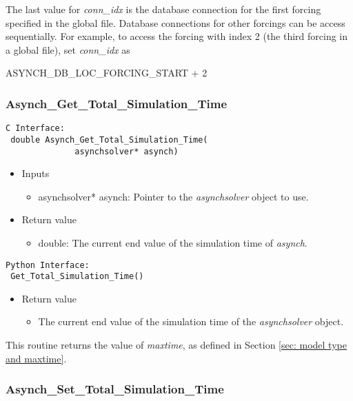 \documentclass[12pt]{article}
\newenvironment{codeindent}
{\begin{list}{}
        {\setlength{\leftmargin}{.1in}}
        \item[]
}
{\end{list}}
\begin{document}
The last value for \emph{conn\_idx} is the database connection for the first forcing specified in the global file. Database connections for other forcings can be access sequentially. For example, to access the forcing with index 2 (the third forcing in a global file), set \emph{conn\_idx} as
\begin{codeindent}
ASYNCH\_DB\_LOC\_FORCING\_START + 2
\end{codeindent}


\subsubsection{Asynch\_Get\_Total\_Simulation\_Time} \label{sec: asynch_get_total_simulation_time}

\begin{lstlisting}[style=CStyle]
 C Interface:
 double Asynch_Get_Total_Simulation_Time(
			  asynchsolver* asynch)
\end{lstlisting}
\begin{itemize}
 \item Inputs
  \begin{itemize}
   \item asynchsolver* asynch: Pointer to the \emph{asynchsolver} object to use.
  \end{itemize}
 \item Return value
  \begin{itemize}
   \item double: The current end value of the simulation time of \emph{asynch}.
  \end{itemize}
\end{itemize}
\begin{lstlisting}[style=PythonStyle]
 Python Interface:
 Get_Total_Simulation_Time()
\end{lstlisting}
\begin{itemize}
 \item Return value
  \begin{itemize}
   \item The current end value of the simulation time of the \emph{asynchsolver} object.
  \end{itemize}
\end{itemize}
This routine returns the value of \emph{maxtime}, as defined in Section \ref{sec: model type and maxtime}.


\subsubsection{Asynch\_Set\_Total\_Simulation\_Time} \label{sec: asynch_set_total_simulation_time}
\end{document}
